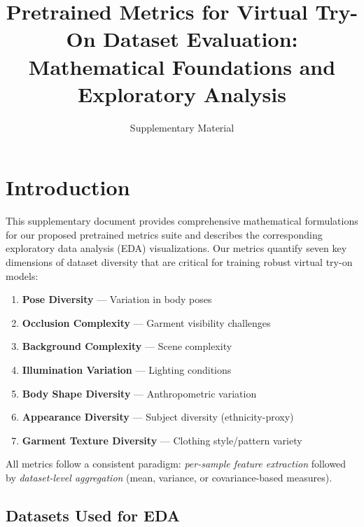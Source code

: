 \documentclass[runningheads]{llncs}
\begin{document}
\title{Pretrained Metrics for Virtual Try-On Dataset Evaluation:\\
Mathematical Foundations and Exploratory Analysis}

\author{Supplementary Material}
\institute{}

\maketitle

\section{Introduction}

This supplementary document provides comprehensive mathematical formulations for our proposed pretrained metrics suite and describes the corresponding exploratory data analysis (EDA) visualizations. Our metrics quantify seven key dimensions of dataset diversity that are critical for training robust virtual try-on models:

\begin{enumerate}
    \item \textbf{Pose Diversity} --- Variation in body poses
    \item \textbf{Occlusion Complexity} --- Garment visibility challenges
    \item \textbf{Background Complexity} --- Scene complexity
    \item \textbf{Illumination Variation} --- Lighting conditions
    \item \textbf{Body Shape Diversity} --- Anthropometric variation
    \item \textbf{Appearance Diversity} --- Subject diversity (ethnicity-proxy)
    \item \textbf{Garment Texture Diversity} --- Clothing style/pattern variety
\end{enumerate}

All metrics follow a consistent paradigm: \textit{per-sample feature extraction} followed by \textit{dataset-level aggregation} (mean, variance, or covariance-based measures).

\subsection{Datasets Used for EDA}
\end{document}
